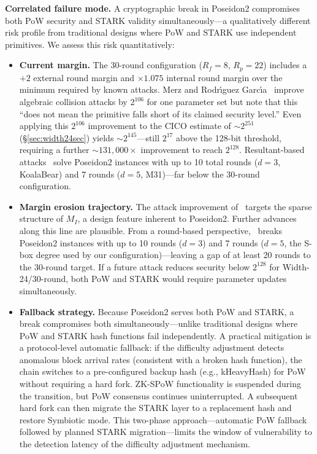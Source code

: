 \documentclass[11pt,a4paper]{article}
\begin{document}
\textbf{Correlated failure mode.} A cryptographic break in Poseidon2 compromises both PoW security and STARK validity simultaneously---a qualitatively different risk profile from traditional designs where PoW and STARK use independent primitives. We assess this risk quantitatively:

\begin{itemize}
\item \textbf{Current margin.} The 30-round configuration ($R_f = 8$, $R_p = 22$) includes a $+2$ external round margin and $\times 1.075$ internal round margin over the minimum required by known attacks. Merz and Rodr{\'\i}guez Garc{\'\i}a~\cite{skipping2026} improve algebraic collision attacks by $2^{106}$ for one parameter set but note that this ``does not mean the primitive falls short of its claimed security level.'' Even applying this $2^{106}$ improvement to the CICO estimate of ${\sim}2^{251}$ (\S\ref{sec:width24sec}) yields ${\sim}2^{145}$---still $2^{17}$ above the 128-bit threshold, requiring a further ${\sim}131{,}000\times$ improvement to reach $2^{128}$. Resultant-based attacks~\cite{resultant2026} solve Poseidon2 instances with up to 10 total rounds ($d = 3$, KoalaBear) and 7 rounds ($d = 5$, M31)---far below the 30-round configuration.

\item \textbf{Margin erosion trajectory.} The attack improvement of~\cite{skipping2026} targets the sparse structure of $M_I$, a design feature inherent to Poseidon2. Further advances along this line are plausible. From a round-based perspective,~\cite{resultant2026} breaks Poseidon2 instances with up to 10 rounds ($d = 3$) and 7 rounds ($d = 5$, the S-box degree used by our configuration)---leaving a gap of at least 20 rounds to the 30-round target. If a future attack reduces security below $2^{128}$ for Width-24/30-round, both PoW and STARK would require parameter updates simultaneously.

\item \textbf{Fallback strategy.} Because Poseidon2 serves both PoW and STARK, a break compromises both simultaneously---unlike traditional designs where PoW and STARK hash functions fail independently. A practical mitigation is a protocol-level automatic fallback: if the difficulty adjustment detects anomalous block arrival rates (consistent with a broken hash function), the chain switches to a pre-configured backup hash (e.g., kHeavyHash) for PoW without requiring a hard fork. ZK-SPoW functionality is suspended during the transition, but PoW consensus continues uninterrupted. A subsequent hard fork can then migrate the STARK layer to a replacement hash and restore Symbiotic mode. This two-phase approach---automatic PoW fallback followed by planned STARK migration---limits the window of vulnerability to the detection latency of the difficulty adjustment mechanism.
\end{itemize}
\end{document}
